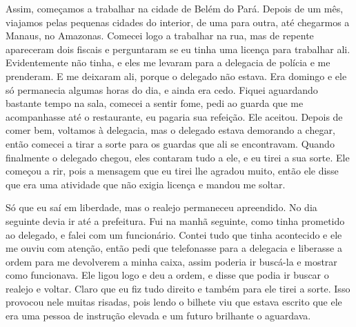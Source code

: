 


Assim, começamos a trabalhar na cidade de Belém do Pará. Depois de um
mês, viajamos pelas pequenas cidades do interior, de uma para
outra, até chegarmos a Manaus, no Amazonas. Comecei logo a trabalhar na
rua, mas de repente apareceram dois fiscais e perguntaram se eu tinha uma
licença para trabalhar ali. Evidentemente não tinha, e eles me
levaram para a delegacia de polícia e me prenderam. E me deixaram ali,
porque o delegado não estava. Era domingo e ele só permanecia algumas
horas do dia, e ainda era cedo. Fiquei aguardando bastante tempo na
sala, comecei a sentir fome, pedi ao guarda que me acompanhasse até o
restaurante, eu pagaria sua refeição. Ele aceitou. Depois de comer
bem, voltamos à delegacia, mas o delegado estava demorando a chegar,
então comecei a tirar a sorte para os guardas que ali se encontravam.
Quando finalmente o delegado chegou, eles contaram tudo a ele, e eu
tirei a sua sorte. Ele começou a rir, pois a mensagem que eu tirei lhe
agradou muito, então ele disse que era uma atividade que não exigia
licença e mandou me soltar.

Só que eu saí em liberdade, mas o realejo permaneceu apreendido. No dia
seguinte devia ir até a prefeitura. Fui na manhã seguinte, como tinha
prometido ao delegado, e falei com um funcionário. Contei tudo que tinha
acontecido e ele me ouviu com atenção, então pedi que telefonasse para a
delegacia e liberasse a ordem para me devolverem a minha caixa, assim poderia
ir buscá-la e mostrar como funcionava. Ele ligou logo e deu a ordem, e
disse que podia ir buscar o realejo e voltar. Claro que eu fiz tudo
direito e também para ele tirei a sorte. Isso provocou nele muitas
risadas, pois lendo o bilhete viu que estava escrito que ele era uma
pessoa de instrução elevada e um futuro brilhante o aguardava.

